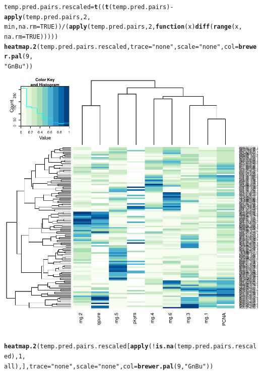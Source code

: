 \documentclass{article}\usepackage[]{graphicx}\usepackage[]{color}
\makeatletter
\def\maxwidth{ %
  \ifdim\Gin@nat@width>\linewidth
    \linewidth
  \else
    \Gin@nat@width
  \fi
}
\newcommand{\hlnum}[1]{\textcolor[rgb]{0.686,0.059,0.569}{#1}}%
\newcommand{\hlstr}[1]{\textcolor[rgb]{0.192,0.494,0.8}{#1}}%
\newcommand{\hlopt}[1]{\textcolor[rgb]{0,0,0}{#1}}%
\newcommand{\hlstd}[1]{\textcolor[rgb]{0.345,0.345,0.345}{#1}}%
\newcommand{\hlkwa}[1]{\textcolor[rgb]{0.161,0.373,0.58}{\textbf{#1}}}%
\newcommand{\hlkwb}[1]{\textcolor[rgb]{0.69,0.353,0.396}{#1}}%
\newcommand{\hlkwc}[1]{\textcolor[rgb]{0.333,0.667,0.333}{#1}}%
\newcommand{\hlkwd}[1]{\textcolor[rgb]{0.737,0.353,0.396}{\textbf{#1}}}%
\newenvironment{kframe}{%
 \def\at@end@of@kframe{}%
 \ifinner\ifhmode%
  \def\at@end@of@kframe{\end{minipage}}%
  \begin{minipage}{\columnwidth}%
 \fi\fi%
 \def\FrameCommand##1{\hskip\@totalleftmargin \hskip-\fboxsep
 \colorbox{shadecolor}{##1}\hskip-\fboxsep
     \hskip-\linewidth \hskip-\@totalleftmargin \hskip\columnwidth}%
 \MakeFramed {\advance\hsize-\width
   \@totalleftmargin\z@ \linewidth\hsize
   \@setminipage}}%
 {\par\unskip\endMakeFramed%
 \at@end@of@kframe}
\newenvironment{knitrout}{}{} %
\makeatother
\begin{document}
\begin{knitrout}
{}


\begin{kframe}\begin{alltt}
\hlstd{temp.pred.pairs.rescaled} \hlkwb{=} \hlkwd{t}\hlstd{((}\hlkwd{t}\hlstd{(temp.pred.pairs)} \hlopt{-} \hlkwd{apply}\hlstd{(temp.pred.pairs,} \hlnum{2}\hlstd{,}
    \hlstd{min,} \hlkwc{na.rm} \hlstd{=} \hlnum{TRUE}\hlstd{))}\hlopt{/}\hlstd{(}\hlkwd{apply}\hlstd{(temp.pred.pairs,} \hlnum{2}\hlstd{,} \hlkwa{function}\hlstd{(}\hlkwc{x}\hlstd{)} \hlkwd{diff}\hlstd{(}\hlkwd{range}\hlstd{(x,}
    \hlkwc{na.rm} \hlstd{=} \hlnum{TRUE}\hlstd{)))))}
\hlkwd{heatmap.2}\hlstd{(temp.pred.pairs.rescaled,} \hlkwc{trace} \hlstd{=} \hlstr{"none"}\hlstd{,} \hlkwc{scale} \hlstd{=} \hlstr{"none"}\hlstd{,} \hlkwc{col} \hlstd{=} \hlkwd{brewer.pal}\hlstd{(}\hlnum{9}\hlstd{,}
    \hlstr{"GnBu"}\hlstd{))}
\end{alltt}
\end{kframe}

{\centering \includegraphics[width=\maxwidth]{figure/metagene-pairs-2} 

}


\begin{kframe}\begin{alltt}
\hlkwd{heatmap.2}\hlstd{(temp.pred.pairs.rescaled[}\hlkwd{apply}\hlstd{(}\hlopt{!}\hlkwd{is.na}\hlstd{(temp.pred.pairs.rescaled),} \hlnum{1}\hlstd{,}
    \hlstd{all), ],} \hlkwc{trace} \hlstd{=} \hlstr{"none"}\hlstd{,} \hlkwc{scale} \hlstd{=} \hlstr{"none"}\hlstd{,} \hlkwc{col} \hlstd{=} \hlkwd{brewer.pal}\hlstd{(}\hlnum{9}\hlstd{,} \hlstr{"GnBu"}\hlstd{))}
\end{alltt}
\end{kframe}


\end{knitrout}
\end{document}

